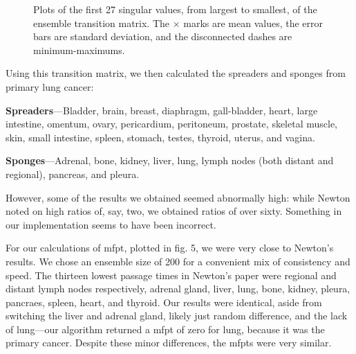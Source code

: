 \documentclass[letterpaper,12pt]{article}
\begin{document}
\begin{figure}[h!]

	\caption{Plots of the first 27 singular values, from largest to smallest, of the ensemble transition matrix. The $\times$ marks are mean values, the error bars are standard deviation, and the disconnected dashes are minimum-maximums.}
\end{figure}

Using this transition matrix, we then calculated the spreaders and sponges from primary lung cancer:

\textbf{Spreaders}---Bladder, brain, breast, diaphragm, gall-bladder, heart, large intestine, omentum, ovary, pericardium, peritoneum, prostate, skeletal muscle, skin, small intestine, spleen, stomach, testes, thyroid, uterus, and vagina.

\textbf{Sponges}---Adrenal, bone, kidney, liver, lung, lymph nodes (both distant and regional), pancreas, and pleura.

However, some of the results we obtained seemed abnormally high: while Newton noted on high ratios of, say, two, we obtained ratios of over sixty. Something in our implementation seems to have been incorrect.

For our calculations of mfpt, plotted in fig. 5, we were very close to Newton's results. We chose an ensemble size of 200 for a convenient mix of consistency and speed. The thirteen lowest passage times in Newton's paper were regional and distant lymph nodes respectively, adrenal gland, liver, lung, bone, kidney, pleura, pancraes, spleen, heart, and thyroid. Our results were identical, aside from switching the liver and adrenal gland, likely just random difference, and the lack of lung---our algorithm returned a mfpt of zero for lung, because it was the primary cancer. Despite these minor differences, the mfpts were very similar.
\end{document}
